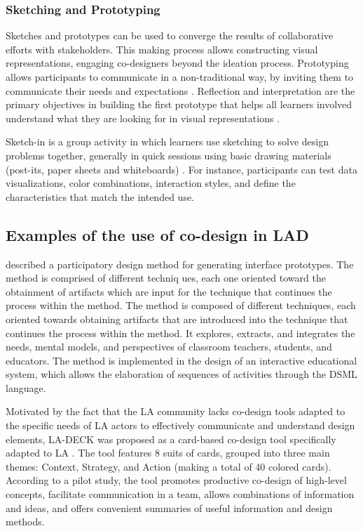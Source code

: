 \documentclass[manuscript,screen,nonacm,12pt]{acmart}
\begin{document}
\subsubsection{Sketching and Prototyping}
Sketches and prototypes can be used to converge the results of collaborative efforts with stakeholders. This making process allows constructing visual representations, engaging co-designers beyond the ideation process. Prototyping allows participants to communicate in a non-traditional way, by inviting them to communicate their needs and expectations \cite{gaver1999design}.
Reflection and interpretation are the primary objectives in building the first prototype that helps all learners involved understand what they are looking for in visual representations \cite{luckin2013handbook}.

Sketch-in is a group activity in which learners use sketching to solve design problems together, generally in quick sessions using basic drawing materials (post-its, paper sheets and whiteboards) \cite{prieto2018co}. For instance, participants can test data visualizations, color combinations, interaction styles, and define the characteristics that match the intended use.

\subsection{Examples of the use of co-design in LAD}
\citet{ruiz2018participatory} described a participatory design method for generating interface prototypes. The method is comprised of
different techniq ues, each one oriented toward the obtainment of
artifacts which are input for the technique that continues the
process within the method. The method is composed of different techniques, each oriented towards obtaining artifacts that are introduced into the technique that continues the process within the method. It explores, extracts, and integrates the needs, mental models, and perspectives of classroom teachers, students, and educators. The method is implemented in the design of an interactive educational system, which allows the elaboration of sequences of activities through the DSML language.

Motivated by the fact that the LA community lacks co-design tools adapted to the specific needs of LA actors to effectively communicate and understand design elements, LA-DECK was proposed as a card-based co-design tool specifically adapted to LA \cite{Alvarez2020}. The tool features 8 suits of cards, grouped into three main themes: Context, Strategy, and Action (making a total of 40 colored cards). According to a pilot study, the tool  promotes productive co-design of high-level concepts, facilitate communication in a team, allows  combinations of information and ideas, and offers convenient summaries of useful information and design methods.
\end{document}
